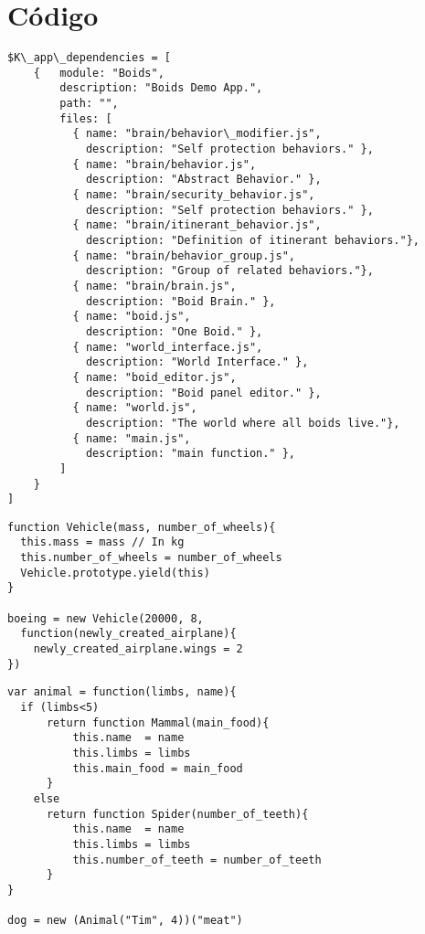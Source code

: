 \section{Código}
\label{sec:codigo}

\begin{lstlisting}[caption=Ejemplo de archivo dependencies, label={lst:code211}]
$K\_app\_dependencies = [
    {   module: "Boids", 
        description: "Boids Demo App.",
        path: "",
        files: [
          { name: "brain/behavior\_modifier.js",  
            description: "Self protection behaviors." },
          { name: "brain/behavior.js",           
            description: "Abstract Behavior." },
          { name: "brain/security_behavior.js",  
            description: "Self protection behaviors." },
          { name: "brain/itinerant_behavior.js", 
            description: "Definition of itinerant behaviors."},
          { name: "brain/behavior_group.js",     
            description: "Group of related behaviors."},
          { name: "brain/brain.js",              
            description: "Boid Brain." },
          { name: "boid.js",                     
            description: "One Boid." },
          { name: "world_interface.js",          
            description: "World Interface." },
          { name: "boid_editor.js",              
            description: "Boid panel editor." },
          { name: "world.js",                    
            description: "The world where all boids live."},
          { name: "main.js",                     
            description: "main function." },
        ]
    }
]
\end{lstlisting}

\begin{lstlisting}[caption=Ejemplo clase, label={lst:code411}]
 function Vehicle(mass, number_of_wheels){
  this.mass = mass // In kg 
  this.number_of_wheels = number_of_wheels
  Vehicle.prototype.yield(this)
}

boeing = new Vehicle(20000, 8, 
  function(newly_created_airplane){
    newly_created_airplane.wings = 2
})
\end{lstlisting}


\begin{lstlisting}[caption=Ejemplo clase con funciones, label={lst:code412}]
 var animal = function(limbs, name){
  if (limbs<5)
      return function Mammal(main_food){
          this.name  = name
          this.limbs = limbs
          this.main_food = main_food
      }
    else
      return function Spider(number_of_teeth){
          this.name  = name
          this.limbs = limbs
          this.number_of_teeth = number_of_teeth
      }
}

dog = new (Animal("Tim", 4))("meat")

\end{lstlisting}


